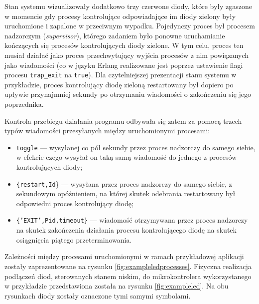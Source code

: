 Stan systemu wizualizowały dodatkowo trzy czerwone diody, które były zgaszone w momencie gdy procesy kontrolujące odpowiadające im diody zielony były uruchomione i zapalone w przeciwnym wypadku.
Pojedynczy proces był procesem nadzorczym (\emph{supervisor}), którego zadaniem było ponowne uruchamianie kończących się procesów kontrolujących diody zielone. W tym celu, proces ten musiał działać jako proces przechwytujący wyjścia procesów z nim powiązanych jako wiadomości (co w języku Erlang realizowane jest poprzez ustawienie flagi procesu \texttt{trap\_exit} na \texttt{true}).
Dla czytelniejszej prezentacji stanu systemu w przykładzie, proces kontrolujący diodę zieloną restartowany był dopiero po upływie przynajmniej sekundy po otrzymaniu wiadomości o zakończeniu się jego poprzednika.

Kontrola przebiegu działania programu odbywała się zatem za pomocą trzech typów wiadomości przesyłanych między uruchomionymi procesami:
\begin{itemize}
\item \texttt{toggle} --- wysyłanej co pół sekundy przez proces nadzorczy do samego siebie, w efekcie czego wysyłał on taką samą wiadomość do jednego z procesów kontrolujących diody;
\item \texttt{\{restart,Id}\} --- wysyłana przez proces nadzorczy do samego siebie, z sekundowym opóźnieniem, na której skutek odebrania restartowany był odpowiedni proces kontrolujący diodę;
\item \texttt{\{'EXIT',Pid,timeout\}} --- wiadomość otrzymywana przez proces nadzorczy na skutek zakończenia działania procesu kontrolującego diodę na skutek osiągnięcia piątego przeterminowania.
\end{itemize}

Zależności między procesami uruchomionymi w ramach przykładowej aplikacji zostały zaprezentowane na rysunku \ref{fig:exampleledprocesses}. Fizyczna realizacja podłączeń diod, sterowanych stanem niskim, do mikrokontrolera wykorzystanego w przykładzie przedstawiona została na rysunku \ref{fig:exampleled}. Na obu rysunkach diody zostały oznaczone tymi samymi symbolami.



